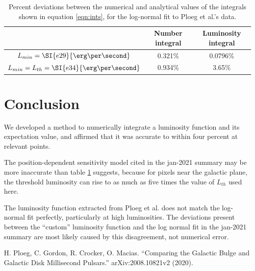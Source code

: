 \documentclass{C://Aliases//Dropbox-MIT//Latex_Templates//personal}
\begin{document}
\begin{table}[h]
    \centering
    \begin{tabular}{|c|c|c|}
        \hline
        & Number integral & Luminosity integral \\ \hline
        $L_{min} = \SI{e29}{\erg\per\second}$ & 0.321\% & 0.0796\%\\ \hline
        $L_{min} = L_{th} = \SI{e34}{\erg\per\second}$ & 0.934\% & 3.65\% \\ \hline
    \end{tabular}
    \caption{Percent deviations between the numerical and analytical values of the integrals shown in equation \ref{eqn:ints}, for the log-normal fit to Ploeg et al.'s data.}
    \label{tab:calc-points}
\end{table}


\section{Conclusion}
We developed a method to numerically integrate a luminosity function and its expectation value, and affirmed that it was accurate to within four percent at relevant points.

The position-dependent sensitivity model cited in the jan-2021 summary may be more inaccurate than table \ref{tab:calc-points} suggests, because for pixels near the galactic plane, the threshold luminosity can rise to as much as five times the value of $L_{th}$ used here.

The luminosity function extracted from Ploeg et al. does not match the log-normal fit perfectly, particularly at high luminosities. The deviations present between the ``custom'' luminosity function and the log normal fit in the jan-2021 summary are most likely caused by this disagreement, not numerical error.


\begin{thebibliography}{99}
     H. Ploeg, C. Gordon, R. Crocker, O. Macias. ``Comparing the Galactic Bulge and Galactic Disk Millisecond Pulsars.'' arXiv:2008.10821v2 (2020).

\end{thebibliography}
\end{document}
